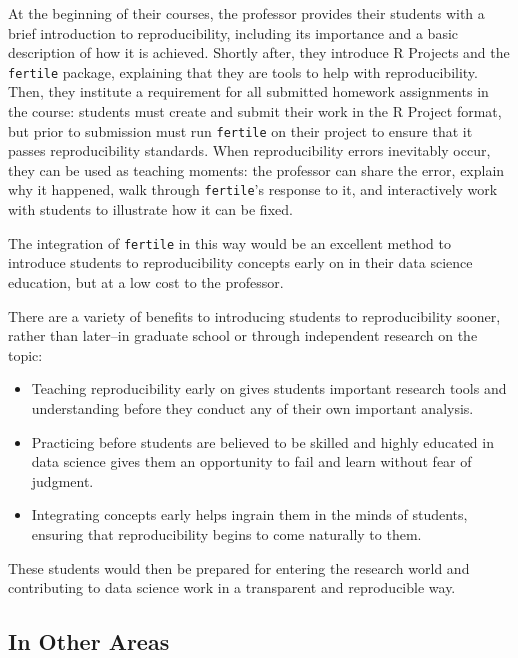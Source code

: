 \documentclass[12pt,twoside]{reedthesis}
\begin{document}
At the beginning of their courses, the professor provides their students with a brief introduction to reproducibility, including its importance and a basic description of how it is achieved. Shortly after, they introduce R Projects and the \texttt{fertile} package, explaining that they are tools to help with reproducibility. Then, they institute a requirement for all submitted homework assignments in the course: students must create and submit their work in the R Project format, but prior to submission must run \texttt{fertile} on their project to ensure that it passes reproducibility standards. When reproducibility errors inevitably occur, they can be used as teaching moments: the professor can share the error, explain why it happened, walk through \texttt{fertile}'s response to it, and interactively work with students to illustrate how it can be fixed.

The integration of \texttt{fertile} in this way would be an excellent method to introduce students to reproducibility concepts early on in their data science education, but at a low cost to the professor.

There are a variety of benefits to introducing students to reproducibility sooner, rather than later--in graduate school or through independent research on the topic:
\begin{itemize}
\item
  Teaching reproducibility early on gives students important research tools and understanding before they conduct any of their own important analysis.
\item
  Practicing before students are believed to be skilled and highly educated in data science gives them an opportunity to fail and learn without fear of judgment.
\item
  Integrating concepts early helps ingrain them in the minds of students, ensuring that reproducibility begins to come naturally to them.
\end{itemize}
These students would then be prepared for entering the research world and contributing to data science work in a transparent and reproducible way.

\hypertarget{in-other-areas}{%
\subsection{In Other Areas}\label{in-other-areas}}
\end{document}
